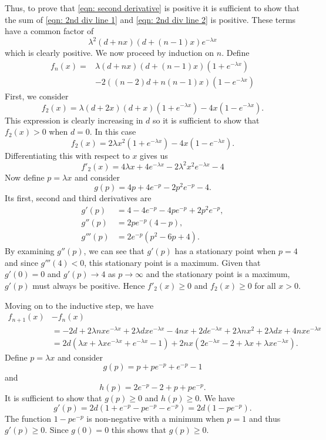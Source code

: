 \documentclass[11pt,a4paper]{article}
\begin{document}
Thus, to prove that \eqref{eqn: second derivative} is positive it is sufficient to show that the sum of \eqref{eqn: 2nd div line 1} and \eqref{eqn: 2nd div line 2} is positive.
These terms have a common factor of 
$$ \lambda^2(d+nx)(d+(n-1)x)e^{-\lambda x} $$ which is clearly positive.
We now proceed by induction on $n$.
Define
\begin{align}
    f_n(x) =& \lambda(d+nx)(d+(n-1)x)(1+e^{-\lambda x}) \\
    & -2((n-2)d+n(n-1)x)(1-e^{-\lambda x})
\end{align}
First, we consider
\begin{equation*}
    f_2(x) = \lambda(d+2x)(d+x)(1+e^{-\lambda x}) - 4x(1-e^{-\lambda x}).
\end{equation*}
This expression is clearly increasing in $d$ so it is sufficient to show that $f_2(x) > 0$ when $d = 0$.
In this case 
\begin{equation*}
    f_2(x) = 2\lambda x^2(1+e^{-\lambda x}) - 4x(1-e^{-\lambda x}).
\end{equation*}
Differentiating this with respect to $x$ gives us
$$ f'_2(x) = 4 \lambda x + 4 e^{-\lambda x} - 2 \lambda^2 x^2 e^{-\lambda x} - 4$$
Now define $p = \lambda x$ and consider 
$$ g(p) = 4p + 4e^{-p} - 2p^2e^{-p} - 4 .$$
Its first, second and third derivatives are
\begin{align*}
    g'(p) &= 4 - 4e^{-p} - 4pe^{-p} + 2p^2 e^{-p}, \\
    g''(p) &= 2pe^{-p} (4-p),\\
    g'''(p) &= 2e^{-p} (p^2 -6p +4).
\end{align*}
By examining $g''(p)$, we can see that $g'(p)$ has a stationary point when $p = 4$ and since $g'''(4) < 0$, this stationary point is a maximum. 
Given that $g'(0) =0$ and $g'(p) \rightarrow 4$ as $p \rightarrow \infty$ and the stationary point is a maximum, $g'(p)$ must always be positive.
Hence $f'_2(x) \geq 0$ and $f_2(x) \geq 0$ for all $x > 0$.

Moving on to the inductive step, we have 
\begin{align*}
    f_{n+1}(x) &- f_n(x) \\
    &= -2d + 2\lambda n x e^{-\lambda x} + 2 \lambda d x e^{-\lambda x} - 4nx + 2de^{-\lambda x} + 2 \lambda n x^2 + 2 \lambda d x + 4nxe^{-\lambda x} \\
    &=2d (\lambda x + \lambda x e^{-\lambda x} + e^{-\lambda x} -1) + 2nx (2 e^{-\lambda x} - 2 + \lambda x + \lambda x e^{-\lambda x}).
\end{align*}
Define $p = \lambda x$ and consider
$$ g(p) = p + pe^{-p} + e^{-p} -1 $$
and 
$$ h(p) = 2 e^{-p} - 2 + p + pe^{-p} .$$
It is sufficient to show that $g(p) \geq 0$ and $h(p) \geq 0$.
We have 
$$ g'(p) = 2d (1+e^{-p}-pe^{-p}-e^{-p}) = 2d(1-pe^{-p}). $$
The function $1-pe^{-p}$ is non-negative with a minimum when $p=1$ and thus $g'(p) \geq 0$.
Since $g(0) =0$ this shows that $g(p) \geq 0$.
\end{document}

